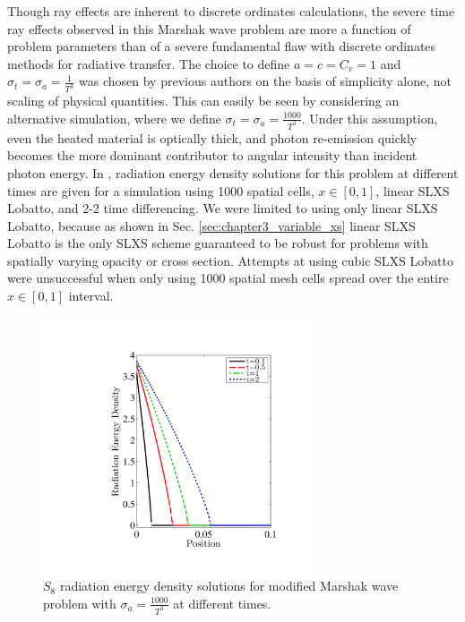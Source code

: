 Though ray effects are inherent to discrete ordinates calculations, the severe time ray effects observed in this Marshak wave problem are more a function of problem parameters than of a severe fundamental flaw with discrete ordinates methods for radiative transfer.
The choice to define $a=c=C_v=1$ and $\sigma_t = \sigma_a = \frac{1}{T^3}$ was chosen by previous authors on the basis of simplicity alone, not scaling of physical quantities.
This can easily be seen by considering an alternative simulation, where we define $\sigma_t = \sigma_a = \frac{1000}{T^3}$.
Under this assumption, even the heated material is optically thick, and photon re-emission quickly becomes the more dominant contributor to angular intensity than incident photon energy.
In , radiation energy density solutions for this problem at different times are given for a simulation using 1000 spatial cells, $x\in[0,1]$, linear SLXS Lobatto, and 2-2 time differencing.
We were limited to using only linear SLXS Lobatto, because as shown in Sec. \ref{sec:chapter3_variable_xs} linear SLXS Lobatto is the only SLXS scheme guaranteed to be robust for problems with spatially varying opacity or cross section.
Attempts at using cubic SLXS Lobatto were unsuccessful when only using 1000 spatial mesh cells spread over the entire $x\in[0,1]$ interval.
\begin{figure}[!htp]
\centering
\includegraphics[width=8cm,trim=1in  0.5in 1in 0.75in,clip=true]{chapter6_grey_radtran/Dissertation_Data/P1_S8_Time_Ray_Effects_Radiation_Cv1_SigA1000.pdf}
\caption{$S_{8}$ radiation energy density solutions for modified Marshak wave problem with $\sigma_a = \frac{1000}{T^3}$ at different times.}
\label{fig:sig_a_1000_radiation}
\end{figure}
